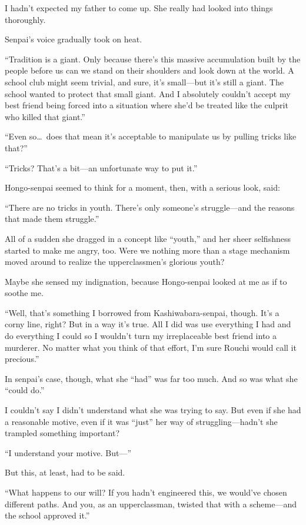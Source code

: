 \documentclass[
    a4paper,
    12pt,
    twoside,
    openany,
    UTF8,
    fontset=windows
]{ctexbook}
\begin{document}
I hadn't expected my father to come up. She really had looked into things thoroughly.

Senpai's voice gradually took on heat.

``Tradition is a giant. Only because there's this massive accumulation built by the people before us can we stand on their shoulders and look down at the world. A school club might seem trivial, and sure, it's small---but it's still a giant. The school wanted to protect that small giant. And I absolutely couldn't accept my best friend being forced into a situation where she'd be treated like the culprit who killed that giant.''

``Even so\dots\ does that mean it's acceptable to manipulate us by pulling tricks like that?''

``Tricks? That's a bit---an unfortunate way to put it.''

Hongo-senpai seemed to think for a moment, then, with a serious look, said:

``There are no tricks in youth. There's only someone's struggle---and the reasons that made them struggle.''

All of a sudden she dragged in a concept like ``youth,'' and her sheer selfishness started to make me angry, too. Were we nothing more than a stage mechanism moved around to realize the upperclassmen's glorious youth?

Maybe she sensed my indignation, because Hongo-senpai looked at me as if to soothe me.

``Well, that's something I borrowed from Kashiwabara-senpai, though. It's a corny line, right? But in a way it's true. All I did was use everything I had and do everything I could so I wouldn't turn my irreplaceable best friend into a murderer. No matter what you think of that effort, I'm sure Rouchi would call it precious.''

In senpai's case, though, what she ``had'' was far too much. And so was what she ``could do.''

I couldn't say I didn't understand what she was trying to say. But even if she had a reasonable motive, even if it was ``just'' her way of struggling---hadn't she trampled something important?

``I understand your motive. But---''

But this, at least, had to be said.

``What happens to our will? If you hadn't engineered this, we would've chosen different paths. And you, as an upperclassman, twisted that with a scheme---and the school approved it.''
\end{document}
